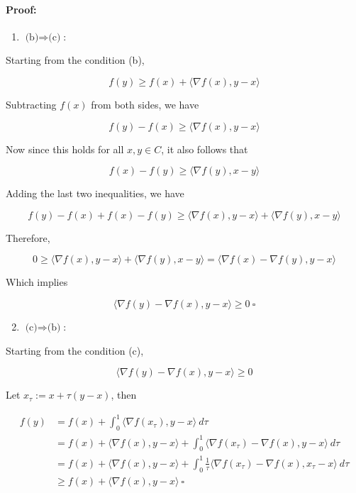 \documentclass[10pt]{article}
\begin{document}
\paragraph{Proof:}


\begin{enumerate}[label=(\alph*)]
  \item $\text{(b)} \Rightarrow \text{(c)}$:
\end{enumerate}

Starting from the condition (b),

$$f(y) \geq f(x) + \langle \nabla f(x), y - x \rangle$$

Subtracting $f(x)$ from both sides, we have

$$f(y) - f(x) \geq \langle \nabla f(x), y - x \rangle$$

Now since this holds for all $x, y \in C$, it also follows that 

$$f(x) - f(y) \geq \langle \nabla f(y), x - y \rangle$$

Adding the last two inequalities, we have

$$f(y)- f(x) + f(x) - f(y) \geq \langle \nabla f(x), y - x \rangle + \langle \nabla f(y), x - y \rangle$$

Therefore,

$$0 \geq \langle \nabla f(x), y - x \rangle + \langle \nabla f(y), x - y \rangle = \langle \nabla f(x) - \nabla f(y), y - x \rangle$$

Which implies 

$$\langle \nabla f(y) - \nabla f(x), y - x \rangle \geq 0 \ \square$$ 






\begin{enumerate}[label=(\alph*)]
  \setcounter{enumi}{1}
  \item $\text{(c)} \Rightarrow \text{(b)}$:
\end{enumerate}


Starting from the condition (c),

$$\langle \nabla f(y) - \nabla f(x), y - x \rangle \geq 0$$

Let $x_{\tau} := x + \tau (y - x)$, then

\begin{align*}
  f(y) &= f(x) + \int_0^1 \langle \nabla f(x_{\tau}), y - x \rangle \ d\tau\\
  &= f(x) + \langle \nabla f(x), y - x \rangle + \int_0^1 \langle \nabla f(x_{\tau}) - \nabla f(x), y - x \rangle \ d\tau\\
  &= f(x) + \langle \nabla f(x), y - x \rangle + \int_0^1 \frac{1}{\tau} \langle \nabla f(x_{\tau}) - \nabla f(x), x_{\tau} - x \rangle \ d\tau\\
  &\geq f(x) + \langle \nabla f(x), y - x \rangle \ \square
\end{align*}
\end{document}
